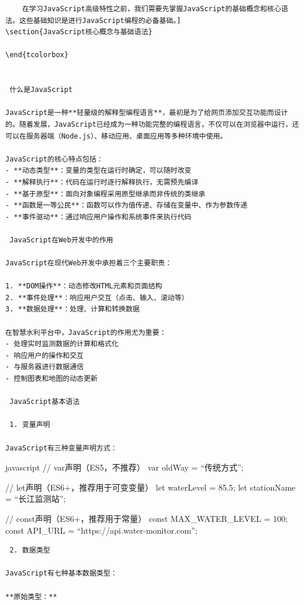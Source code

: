 \begin{lstlisting}
    在学习JavaScript高级特性之前，我们需要先掌握JavaScript的基础概念和核心语法。这些基础知识是进行JavaScript编程的必备基础。]
\section{JavaScript核心概念与基础语法}

\end{tcolorbox}


 什么是JavaScript

JavaScript是一种**轻量级的解释型编程语言**，最初是为了给网页添加交互功能而设计的。随着发展，JavaScript已经成为一种功能完整的编程语言，不仅可以在浏览器中运行，还可以在服务器端（Node.js）、移动应用、桌面应用等多种环境中使用。

JavaScript的核心特点包括：
- **动态类型**：变量的类型在运行时确定，可以随时改变
- **解释执行**：代码在运行时逐行解释执行，无需预先编译
- **基于原型**：面向对象编程采用原型继承而非传统的类继承
- **函数是一等公民**：函数可以作为值传递、存储在变量中、作为参数传递
- **事件驱动**：通过响应用户操作和系统事件来执行代码

 JavaScript在Web开发中的作用

JavaScript在现代Web开发中承担着三个主要职责：

1. **DOM操作**：动态修改HTML元素和页面结构
2. **事件处理**：响应用户交互（点击、输入、滚动等）
3. **数据处理**：处理、计算和转换数据

在智慧水利平台中，JavaScript的作用尤为重要：
- 处理实时监测数据的计算和格式化
- 响应用户的操作和交互
- 与服务器进行数据通信
- 控制图表和地图的动态更新

 JavaScript基本语法

 1. 变量声明

JavaScript有三种变量声明方式：
\end{lstlisting}

javascript // var声明（ES5，不推荐） var oldWay = ``传统方式'';

// let声明（ES6+，推荐用于可变变量） let waterLevel = 85.5; let stationName = ``长江监测站'';

// const声明（ES6+，推荐用于常量） const MAX\_WATER\_LEVEL = 100; const API\_URL = ``https://api.water-monitor.com'';

\begin{lstlisting}
 2. 数据类型

JavaScript有七种基本数据类型：

**原始类型：**
\end{lstlisting}

